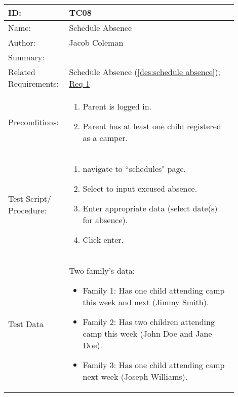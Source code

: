 \documentclass[11pt]{article}
\begin{document}
\begin{table}[H]
\begin{center}
\begin{tabular}{p{0.20\linewidth}p{0.70\linewidth}}
	ID: & TC08\\\hline
	Name: & Schedule Absence \\\hline
	Author: & Jacob Coleman\\\hline
	Summary: &  \\\hline
	Related \hspace{5em} Requirements:& Schedule Absence (\cref{des:schedule absence}); \hyperlink{Req1}{Req 1}\\\hline
	Preconditions:& \begin{enumerate}[topsep=0pt] 
		\item Parent is logged in.
		\item Parent has at least one child registered as a camper.
	\end{enumerate}\\\hline
	Test Script/ Procedure: & \begin{enumerate}[topsep=0pt]
	\item navigate to ``schedules" page.
	\item Select to input excused absence.
	\item Enter appropriate data (select date(s) for absence).
	\item Click enter.
	\end{enumerate}\\\hline
	Test Data & \vspace*{.25em} Two family's data:
	\begin{itemize}[topsep=0pt]
		\item Family 1: Has one child attending camp this week and next (Jimmy Smith).
		\item Family 2: Has two children attending camp this week (John Doe and Jane Doe).
		\item Family 3: Has one child attending camp next week (Joseph Williams).
	\end{itemize}
\end{tabular}
\label{TC08}	
\end{center}
\end{table}
\end{document}
